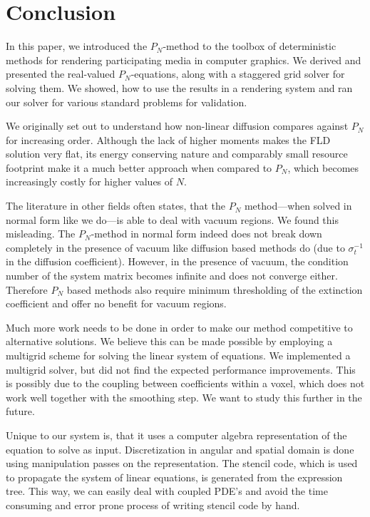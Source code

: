 \section{Conclusion}
\label{sec:conclusion}

In this paper, we introduced the $P_N$-method to the toolbox of deterministic methods for rendering participating media in computer graphics. We derived and presented the real-valued $P_N$-equations, along with a staggered grid solver for solving them. We showed, how to use the results in a rendering system and ran our solver for various standard problems for validation.

We originally set out to understand how non-linear diffusion compares against $P_N$ for increasing order. Although the lack of higher moments makes the FLD solution very flat, its energy conserving nature and comparably small resource footprint make it a much better approach when compared to $P_N$, which becomes increasingly costly for higher values of $N$.

The literature in other fields often states, that the $P_N$ method---when solved in normal form like we do---is able to deal with vacuum regions. We found this misleading. The $P_N$-method in normal form indeed does not break down completely in the presence of vacuum like diffusion based methods do (due to $\sigma_t^{-1}$ in the diffusion coefficient). However, in the presence of vacuum, the condition number of the system matrix becomes infinite and does not converge either. Therefore $P_N$ based methods also require minimum thresholding of the extinction coefficient and offer no benefit for vacuum regions.

Much more work needs to be done in order to make our method competitive to alternative solutions. We believe this can be made possible by employing a multigrid scheme for solving the linear system of equations. We implemented a multigrid solver, but did not find the expected performance improvements. This is possibly due to the coupling between coefficients within a voxel, which does not work well together with the smoothing step. We want to study this further in the future.

Unique to our system is, that it uses a computer algebra representation of the equation to solve as input. Discretization in angular and spatial domain is done using manipulation passes on the representation. The stencil code, which is used to propagate the system of linear equations, is generated from the expression tree. This way, we can easily deal with coupled PDE's and avoid the time consuming and error prone process of writing stencil code by hand.


